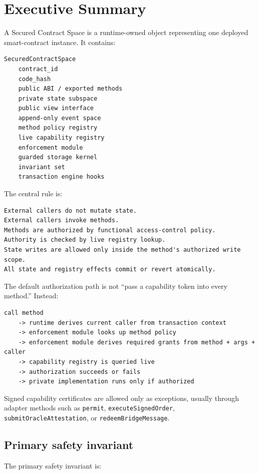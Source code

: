 \documentclass[11pt]{article}
\newcommand{\code}[1]{\texttt{#1}}
\begin{document}
\section{Executive Summary}

A Secured Contract Space is a runtime-owned object representing one deployed smart-contract instance. It contains:

\begin{lstlisting}
SecuredContractSpace
    contract_id
    code_hash
    public ABI / exported methods
    private state subspace
    public view interface
    append-only event space
    method policy registry
    live capability registry
    enforcement module
    guarded storage kernel
    invariant set
    transaction engine hooks
\end{lstlisting}

The central rule is:

\begin{lstlisting}
External callers do not mutate state.
External callers invoke methods.
Methods are authorized by functional access-control policy.
Authority is checked by live registry lookup.
State writes are allowed only inside the method's authorized write scope.
All state and registry effects commit or revert atomically.
\end{lstlisting}

The default authorization path is not ``pass a capability token into every method.'' Instead:

\begin{lstlisting}
call method
    -> runtime derives current caller from transaction context
    -> enforcement module looks up method policy
    -> enforcement module derives required grants from method + args + caller
    -> capability registry is queried live
    -> authorization succeeds or fails
    -> private implementation runs only if authorized
\end{lstlisting}

Signed capability certificates are allowed only as exceptions, usually through adapter methods such as \code{permit}, \code{executeSignedOrder}, \code{submitOracleAttestation}, or \code{redeemBridgeMessage}.

\subsection{Primary safety invariant}

The primary safety invariant is:
\end{document}
